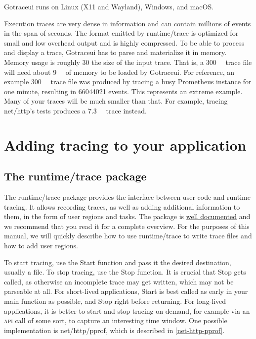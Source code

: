 \documentclass[10pt,letterpaper,oneside,openany,english]{memoir}
\newcommand{\code}[1]{{\ttfamily\mbox{#1}}}
\begin{document}
Gotraceui runs on Linux (X11 and Wayland), Windows, and macOS.

Execution traces are very dense in information and can contain millions of events in the span of seconds.
The format emitted by \code{runtime/trace} is optimized for small and low overhead output and is highly compressed.
To be able to process and display a trace, Gotraceui has to parse and materialize it in memory.
Memory usage is roughly 30\texttimes{} the size of the input trace.
That is, a \qty{300}{\mega\byte} trace file will need about \qty{9}{\giga\byte} of memory to be loaded by Gotraceui.
For reference, an example \qty{300}{\mega\byte} trace file was produced by tracing a busy Prometheus instance for one minute,
resulting in \num{66044021} events.
This represents an extreme example.
Many of your traces will be much smaller than that.
For example, tracing \code{net/http}'s tests produces a \qty{7.3}{\mega\byte} trace instead.

\chapter{Adding tracing to your application}

\section{The \code{runtime/trace} package}

The \code{runtime/trace} package provides the interface between user code and runtime tracing.
It allows recording traces, as well as adding additional information to them, in the form of user regions and tasks.
The package is \href{https://pkg.go.dev/runtime/trace}{well documented}\cite{TracePackageRuntime2023} and we recommend that you read it for a complete overview.
For the purposes of this manual, we will quickly describe how to use \code{runtime/trace} to write trace files and how to add user regions.

To start tracing, use the \code{Start} function and pass it the desired destination, usually a file.
To stop tracing, use the \code{Stop} function.
It is crucial that \code{Stop} gets called, as otherwise an incomplete trace may get written, which may not be parseable at all.
For short-lived applications, \code{Start} is best called as early in your main function as possible, and \code{Stop} right before returning.
For long-lived applications, it is better to start and stop tracing on demand, for example via an \textsc{api} call of some sort, to capture an interesting time window.
One possible implementation is \code{net/http/pprof}, which is described in \cref{net-http-pprof}.
\end{document}
